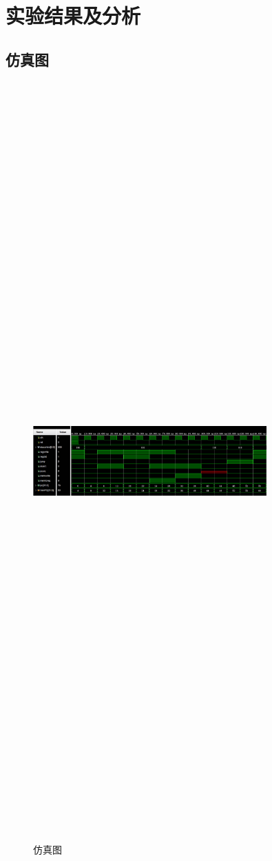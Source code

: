\section{实验结果及分析}
\subsection{仿真图}
\begin{figure}[htbp]
    \centering
    \includegraphics[width=0.8\textwidth,height=20in,keepaspectratio]{Simulation1.jpg}
    \caption{仿真图}
    \label{image4}
\end{figure}

